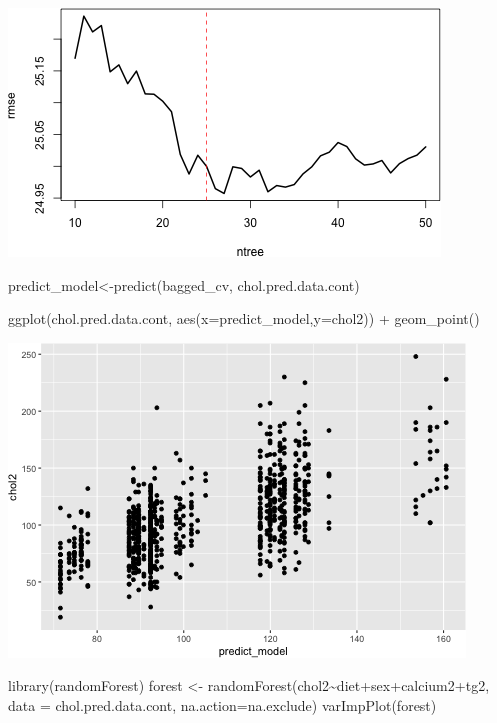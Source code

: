\documentclass[
]{article}
\newenvironment{Shaded}{\begin{snugshade}}{\end{snugshade}}
\newcommand{\AttributeTok}[1]{\textcolor[rgb]{0.77,0.63,0.00}{#1}}
\newcommand{\FunctionTok}[1]{\textcolor[rgb]{0.00,0.00,0.00}{#1}}
\newcommand{\NormalTok}[1]{#1}
\newcommand{\OtherTok}[1]{\textcolor[rgb]{0.56,0.35,0.01}{#1}}
\newcommand{\SpecialCharTok}[1]{\textcolor[rgb]{0.00,0.00,0.00}{#1}}
\begin{document}
\includegraphics{figures/random-forrest-1.png}

\begin{Shaded}
\begin{Highlighting}[]
\NormalTok{predict\_model}\OtherTok{\textless{}{-}}\FunctionTok{predict}\NormalTok{(bagged\_cv, chol.pred.data.cont)}

\FunctionTok{ggplot}\NormalTok{(chol.pred.data.cont, }\FunctionTok{aes}\NormalTok{(}\AttributeTok{x=}\NormalTok{predict\_model,}\AttributeTok{y=}\NormalTok{chol2)) }\SpecialCharTok{+}
  \FunctionTok{geom\_point}\NormalTok{()}
\end{Highlighting}
\end{Shaded}

\includegraphics{figures/random-forrest-2.png}

\begin{Shaded}
\begin{Highlighting}[]
\FunctionTok{library}\NormalTok{(randomForest)}
\NormalTok{forest }\OtherTok{\textless{}{-}} \FunctionTok{randomForest}\NormalTok{(chol2}\SpecialCharTok{\textasciitilde{}}\NormalTok{diet}\SpecialCharTok{+}\NormalTok{sex}\SpecialCharTok{+}\NormalTok{calcium2}\SpecialCharTok{+}\NormalTok{tg2, }
             \AttributeTok{data =}\NormalTok{ chol.pred.data.cont,}
             \AttributeTok{na.action=}\NormalTok{na.exclude) }
\FunctionTok{varImpPlot}\NormalTok{(forest)}
\end{Highlighting}
\end{Shaded}
\end{document}
